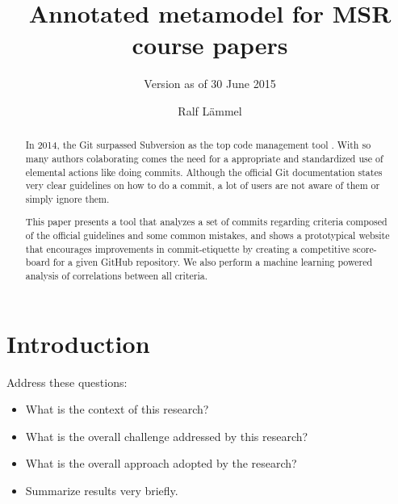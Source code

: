 \documentclass{llncs}
\begin{document}
\title{Annotated metamodel for MSR course papers}

\subtitle{Version as of 30 June 2015}

\author{Ralf L\"ammel}


\maketitle

\begin{abstract}
  In 2014, the Git surpassed Subversion as the top code management tool
  \cite{EComSurv14}. With so many authors colaborating comes the need for a
  appropriate and standardized use of elemental actions like doing commits.
  Although the official Git documentation states very clear guidelines
  \cite{OffGuide} on how to do a commit, a lot of users are not aware of them or
  simply ignore them.

  This paper presents a tool that analyzes a set of commits regarding criteria
  composed of the official guidelines and some common mistakes, and shows a
  prototypical website that encourages improvements in commit-etiquette by
  creating a competitive score-board for a given GitHub repository. We also
  perform a machine learning powered analysis of correlations between all
  criteria.
\end{abstract}


\section{Introduction}

Address these questions:

\begin{itemize}

\item What is the context of this research?

\item What is the overall challenge addressed by this research?

\item What is the overall approach adopted by the research?

\item Summarize results very briefly.

\end{itemize}
\end{document}
